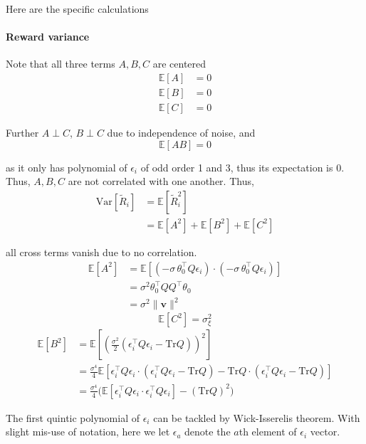     Here are the specific calculations 
    
    \paragraph{Reward variance}
    
    Note that all three terms $A,B,C$ are centered 
    \begin{align*}
    \mathbb{E}[A] & =0\\
    \mathbb{E}[B] & =0\\
    \mathbb{E}[C] & =0
    \end{align*}
    
    Further $A\perp C$, $B\perp C$ due to independence of noise, and
    \[
    \mathbb{E}[AB]=0
    \]
    
    as it only has polynomial of $\epsilon_{i}$ of odd order 1 and 3,
    thus its expectation is 0. Thus, $A,B,C$ are not correlated with
    one another. Thus, 
    \begin{align*}
    \mathrm{Var}[\tilde{R}_{i}] & =\mathbb{E}[\tilde{R}_{i}^{2}]\\
     & =\mathbb{E}[A^{2}]+\mathbb{E}[B^{2}]+\mathbb{E}[C^{2}]
    \end{align*}
    
    all cross terms vanish due to no correlation.
    \begin{align*}
    \mathbb{E}[A^{2}] & =\mathbb{E}[(-\sigma\,\theta_{0}^{\top}Q\epsilon_{i})\cdot(-\sigma\,\theta_{0}^{\top}Q\epsilon_{i})]\\
     & =\sigma^{2}\theta_{0}^{\top}QQ^{\top}\theta_{0}\\
     & =\sigma^{2}\|\mathbf{v}\|^{2}
    \end{align*}
    \[
    \mathbb{E}[C^{2}]=\sigma_{\xi}^{2}
    \]
    \begin{align*}
    \mathbb{E}[B^{2}] & =\mathbb{E}[(\frac{\sigma^{2}}{2}(\epsilon_{i}^{\top}Q\epsilon_{i}-\mathrm{Tr}Q))^{2}]\\
     & =\frac{\sigma^{4}}{4}\mathbb{E}[\epsilon_{i}^{\top}Q\epsilon_{i}\cdot(\epsilon_{i}^{\top}Q\epsilon_{i}-\mathrm{Tr}Q)-\mathrm{Tr}Q\cdot(\epsilon_{i}^{\top}Q\epsilon_{i}-\mathrm{Tr}Q)]\\
     & =\frac{\sigma^{4}}{4}\Big(\mathbb{E}[\epsilon_{i}^{\top}Q\epsilon_{i}\cdot\epsilon_{i}^{\top}Q\epsilon_{i}]-(\mathrm{Tr}Q)^{2}\Big)
    \end{align*}
    
    The first quintic polynomial of $\epsilon_{i}$ can be tackled by
    Wick-Isserelis theorem. With slight mis-use of notation, here we let
    $\epsilon_{a}$ denote the $a$th element of $\epsilon_{i}$ vector.
    
